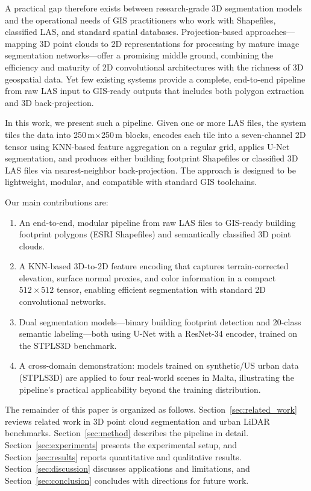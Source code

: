\documentclass[11pt]{article}
\begin{document}
A practical gap therefore exists between research-grade 3D segmentation models and the operational needs of GIS practitioners who work with Shapefiles, classified LAS, and standard spatial databases.
Projection-based approaches---mapping 3D point clouds to 2D representations for processing by mature image segmentation networks---offer a promising middle ground, combining the efficiency and maturity of 2D convolutional architectures with the richness of 3D geospatial data.
Yet few existing systems provide a complete, end-to-end pipeline from raw LAS input to GIS-ready outputs that includes both polygon extraction and 3D back-projection.

In this work, we present such a pipeline.
Given one or more LAS files, the system tiles the data into 250\,m$\times$250\,m blocks, encodes each tile into a seven-channel 2D tensor using KNN-based feature aggregation on a regular grid, applies U-Net segmentation, and produces either building footprint Shapefiles or classified 3D LAS files via nearest-neighbor back-projection.
The approach is designed to be lightweight, modular, and compatible with standard GIS toolchains.

Our main contributions are:
\begin{enumerate}
    \item An end-to-end, modular pipeline from raw LAS files to GIS-ready building footprint polygons (ESRI Shapefiles) and semantically classified 3D point clouds.
    \item A KNN-based 3D-to-2D feature encoding that captures terrain-corrected elevation, surface normal proxies, and color information in a compact $512\times512$ tensor, enabling efficient segmentation with standard 2D convolutional networks.
    \item Dual segmentation models---binary building footprint detection and 20-class semantic labeling---both using U-Net with a ResNet-34 encoder, trained on the STPLS3D benchmark.
    \item A cross-domain demonstration: models trained on synthetic/US urban data (STPLS3D) are applied to four real-world scenes in Malta, illustrating the pipeline's practical applicability beyond the training distribution.
\end{enumerate}

The remainder of this paper is organized as follows.
Section~\ref{sec:related_work} reviews related work in 3D point cloud segmentation and urban LiDAR benchmarks.
Section~\ref{sec:method} describes the pipeline in detail.
Section~\ref{sec:experiments} presents the experimental setup, and Section~\ref{sec:results} reports quantitative and qualitative results.
Section~\ref{sec:discussion} discusses applications and limitations, and Section~\ref{sec:conclusion} concludes with directions for future work.
\end{document}
